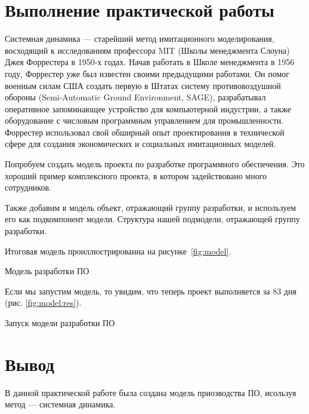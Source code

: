 \graphicspath{{./tenth/img}} %

\section*{Выполнение практической работы}
Системная динамика --- старейший метод имитационного моделирования,
восходящий к исследованиям профессора MIT (Школы менеджмента
Слоуна) Джея Форрестера в 1950-х годах. Начав работать в Школе
менеджмента в 1956 году, Форрестер уже был известен своими
предыдущими работами. Он помог военным силам США создать первую
в Штатах систему противовоздушной обороны (Semi-Automatic Ground
Environment, SAGE), разрабатывал оперативное запоминающее устройство
для компьютерной индустрии, а также оборудование с числовым
программным управлением для промышленности. Форрестер использовал
свой обширный опыт проектирования в технической сфере для создания
экономических и социальных имитационных моделей.\par
Попробуем создать модель проекта по разработке программного
обеспечения. Это хороший пример комплексного проекта, в котором
задействовано много сотрудников.\par
Также добавим в модель объект, отражающий группу разработки, и используем
его как подкомпонент модели. Структура нашей подмодели,
отражающей группу разработки.\par
Итоговая модель проиллюстрированна на рисунке~\ref{fig:model}.

\begin{image}
	\caption{Модель разработки ПО}
	\label{fig:model}
\end{image}

Если мы запустим модель, то увидим, что теперь проект
выполняется за 83 дня (рис. \ref{fig:model:res}).

\begin{image}
	\caption{Запуск модели разработки ПО}
	\label{fig:model:res}
\end{image}

\clearpage

\section*{\LARGE Вывод}
В данной практической работе была создана модель приозводства ПО,
исользуя метод --- системная динамика.

